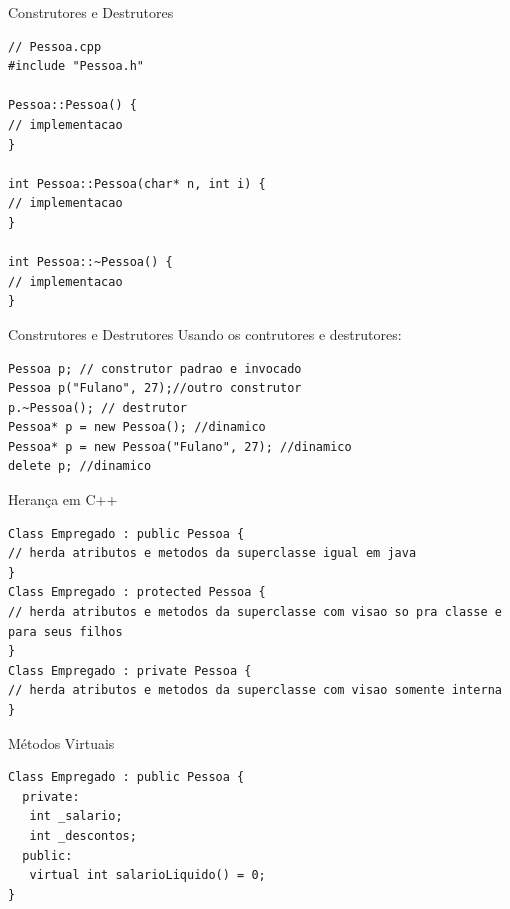 \documentclass[12pt,table,xcolor={dvipsnames}]{beamer}
\begin{document}
\begin{frame}[fragile]{Construtores e Destrutores}
\begin{lstlisting}
// Pessoa.cpp
#include "Pessoa.h"

Pessoa::Pessoa() {
// implementacao
}

int Pessoa::Pessoa(char* n, int i) {
// implementacao
}

int Pessoa::~Pessoa() {
// implementacao
}
\end{lstlisting}
\end{frame}

\begin{frame}[fragile]{Construtores e Destrutores}
Usando os contrutores e destrutores:
\begin{lstlisting}
Pessoa p; // construtor padrao e invocado
Pessoa p("Fulano", 27);//outro construtor
p.~Pessoa(); // destrutor
Pessoa* p = new Pessoa(); //dinamico
Pessoa* p = new Pessoa("Fulano", 27); //dinamico
delete p; //dinamico
\end{lstlisting}
\end{frame}

\begin{frame}[fragile]{Herança em C++}
\begin{lstlisting}
Class Empregado : public Pessoa {
// herda atributos e metodos da superclasse igual em java
}
Class Empregado : protected Pessoa {
// herda atributos e metodos da superclasse com visao so pra classe e para seus filhos
}
Class Empregado : private Pessoa {
// herda atributos e metodos da superclasse com visao somente interna
}
\end{lstlisting}
\end{frame}

\begin{frame}[fragile]{Métodos Virtuais}
\begin{lstlisting}
Class Empregado : public Pessoa {
  private:
   int _salario;
   int _descontos;
  public:
   virtual int salarioLiquido() = 0;
}
\end{lstlisting}
\end{frame}
\end{document}
